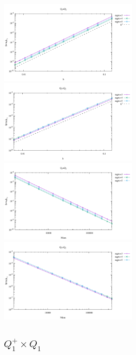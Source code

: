 \begin{center}
\includegraphics[width=7cm]{python_codes/fieldstone_120/results/Q3Q2-velocity-h.pdf}
\includegraphics[width=7cm]{python_codes/fieldstone_120/results/Q3Q2-pressure-h.pdf}\\
\includegraphics[width=7cm]{python_codes/fieldstone_120/results/Q3Q2-velocity-Nfem.pdf}
\includegraphics[width=7cm]{python_codes/fieldstone_120/results/Q3Q2-pressure-Nfem.pdf}
\end{center}

\subsection*{$Q_1^+\times Q_1$}

